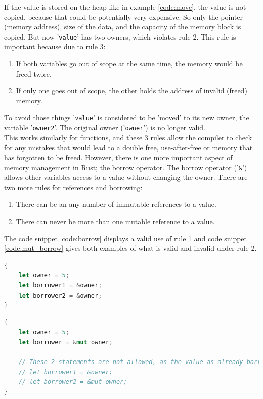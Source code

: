 If the value is stored on the heap like in example \ref{code:move}, the value is not copied, because that could
be potentially very expensive.
So only the pointer (memory address), size of the data, and the capacity of the memory block is copied.
But now '\lstinline{value}' has two owners, which violates rule 2.
This rule is important because due to rule 3:
\begin{enumerate}
    \item If both variables go out of scope at the same time, the memory would be freed twice.
    \item If only one goes out of scope, the other holds the address of invalid (freed) memory.
\end{enumerate}
To avoid those things '\lstinline{value}' is considered to be 'moved' to its new owner, the variable '\lstinline{owner2}'.
The original owner ('\lstinline{owner}') is no longer valid.\\
This works similarly for functions, and these 3 rules allow the compiler to check for any mistakes that would lead to
a double free, use-after-free or memory that has forgotten to be freed.
However, there is one more important aspect of memory management in Rust; the borrow operator.
The borrow operator ('\lstinline{&}') \cite{rust_borrow} allows other variables access to a value without changing the owner.
There are two more rules for references and borrowing:
\begin{enumerate}
    \item There can be an any number of immutable references to a value.
    \item There can never be more than one mutable reference to a value.
\end{enumerate}
The code snippet \ref{code:borrow} displays a valid use of rule 1 and code snippet \ref{code:mut_borrow} gives both examples
of what is valid and invalid under rule 2.

\begin{lstlisting}[style=colorEX,language=Rust,caption={Simple example of an immutable borrow},label={code:borrow}]
{
    let owner = 5;
    let borrower1 = &owner;
    let borrower2 = &owner;
}
\end{lstlisting}

\begin{lstlisting}[style=colorEX,language=Rust,caption={Simple example of a mutable borrow},label={code:mut_borrow}]
{
    let owner = 5;
    let borrower = &mut owner;

    // These 2 statements are not allowed, as the value as already borrowed as mutable.
    // let borrower1 = &owner;
    // let borrower2 = &mut owner;
}
\end{lstlisting}

